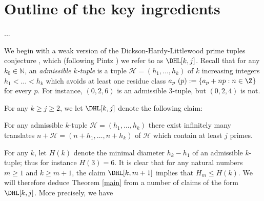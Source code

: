 
\section{Outline of the key ingredients}\label{subclaim-sec}

...

We begin with a weak version of the Dickson-Hardy-Littlewood prime tuples conjecture \cite{hardy}, which (following Pintz \cite{pintz-polignac}) we refer to as $\DHL[k,j]$.  Recall that for any $k_0 \in \mathbb{N}$, an \emph{admissible $k$-tuple} is a tuple ${\mathcal H} = (h_1,\ldots,h_{k})$ of $k$ increasing integers $h_1 < \ldots < h_{k}$ which avoids at least one residue class $a_p\ (p) := \{ a_p + np: n \in \Z \}$ for every $p$.  For instance, $(0,2,6)$ is an admissible $3$-tuple, but $(0,2,4)$ is not.

For any $k \geq j \geq 2$, we let $\DHL[k,j]$ denote the following claim:

\begin{claim} For any admissible $k$-tuple ${\mathcal
    H}=(h_1,\ldots,h_{k})$ there
  exist infinitely many translates $n + {\mathcal H} =
  (n+h_1,\ldots,n+h_{k})$ of ${\mathcal H}$ which contain at least $j$
  primes.
\end{claim}

For any $k$, let $H(k)$ denote the minimal diameter $h_k-h_1$ of an admissible $k$-tuple; thus for instance $H(3)=6$.  It is clear that for any natural numbers $m \geq 1$ and $k \geq m+1$, the claim $\DHL[k,m+1]$ implies that $H_m \leq H(k)$.  We will therefore deduce Theorem \ref{main} from a number of claims of the form $\DHL[k,j]$.  More precisely, we have

